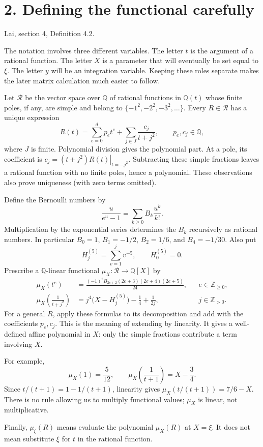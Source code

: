 \documentclass[11pt]{article}
\newcommand{\Q}{\mathbb Q}
\newcommand{\Z}{\mathbb Z}
\newcommand{\Hfive}[1]{H_{#1}^{(5)}}
\newcommand{\source}[1]{{\small\color{blue!45!black}#1}\par}
\newcommand{\heading}[2]{\section*{#1}\source{#2}}
\begin{document}
\newpage
\heading{2. Defining the functional carefully}{Lai, section 4, Definition 4.2.}
The notation involves three different variables. The letter $t$ is the
argument of a rational function. The letter $X$ is a parameter that will
eventually be set equal to $\xi$. The letter $y$ will be an integration
variable. Keeping these roles separate makes the later matrix calculation
much easier to follow.

Let $\mathcal R$ be the vector space over $\Q$ of rational functions in
$\Q(t)$ whose finite poles, if any, are simple and belong to
$\{-1^2,-2^2,-3^2,\ldots\}$. Every $R\in\mathcal R$ has a unique expression
\begin{equation}\label{eq:partial}
 R(t)=\sum_{e=0}^{d}p_et^e+\sum_{j\in J}\frac{c_j}{t+j^2},
 \qquad p_e,c_j\in\Q,
\end{equation}
where $J$ is finite. Polynomial division gives the polynomial part.
At a pole, its coefficient is
$c_j=\left.(t+j^2)R(t)\right|_{t=-j^2}$.
Subtracting these simple fractions leaves a rational function with no finite
poles, hence a polynomial. These observations also prove uniqueness
(with zero terms omitted).

Define the Bernoulli numbers by
\[
 \frac{u}{e^u-1}=\sum_{k\geq0}B_k\frac{u^k}{k!}.
\]
Multiplication by the exponential series determines the $B_k$ recursively
as rational numbers. In particular $B_0=1$, $B_1=-1/2$, $B_2=1/6$,
and $B_4=-1/30$. Also put
\[
 \Hfive{j}=\sum_{v=1}^j v^{-5},\qquad \Hfive{0}=0.
\]
Prescribe a $\Q$-linear functional $\mu_X:\mathcal R\to\Q[X]$ by
\begin{align}
 \mu_X(t^e)&=
 \frac{(-1)^eB_{2e+2}(2e+3)(2e+4)(2e+5)}{24},
 &&e\in\Z_{\geq0},\label{eq:mu-moment}\\
 \mu_X\!\left(\frac1{t+j^2}\right)&=
 j^4\bigl(X-\Hfive{j}\bigr)-\frac14+\frac1{2j},
 &&j\in\Z_{>0}.\label{eq:mu-pole}
\end{align}
For a general $R$, apply these formulas to its decomposition and add with
the coefficients $p_e,c_j$. This is the meaning of extending by linearity.
It gives a well-defined affine polynomial in $X$: only the simple
fractions contribute a term involving $X$.

For example,
\[
 \mu_X(1)=\frac5{12},\qquad
 \mu_X\!\left(\frac1{t+1}\right)=X-\frac34.
\]
Since $t/(t+1)=1-1/(t+1)$, linearity gives
$\mu_X(t/(t+1))=7/6-X$. There is no rule allowing us to multiply
functional values; $\mu_X$ is linear, not multiplicative.

Finally, $\mu_\xi(R)$ means evaluate the polynomial $\mu_X(R)$ at $X=\xi$.
It does not mean substitute $\xi$ for $t$ in the rational function.
\end{document}
